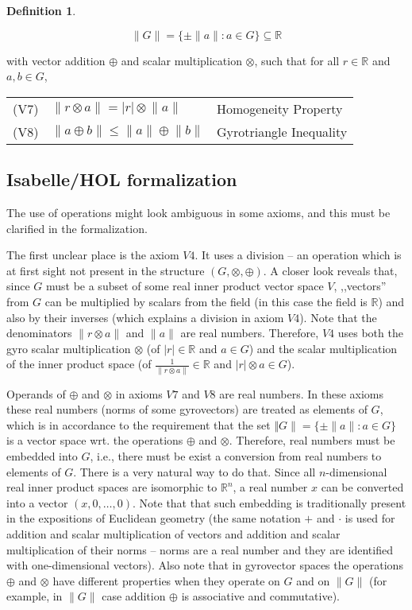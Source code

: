 \documentclass[a4paper]{article}
\theoremstyle{definition}
\newtheorem{definition}{Definition}[section]
\begin{document}
\begin{definition}
\begin{itemize}
  $$\lVert G \rVert = \{\pm \lVert a \rVert:a\in G\}\subseteq \mathbb{R}$$
  
  with vector addition $\oplus$ and scalar multiplication $\otimes$, such that for all $r\in \mathbb{R}$ and $a, b \in G$,\\[2mm]
  \begin{tabular}{cll}
    (V7) & $\lVert r\otimes a \rVert = |r| \otimes \lVert a \rVert$ & Homogeneity Property\\[1mm]
    (V8) & $\lVert a \oplus b \rVert \leq \lVert a \rVert \oplus \lVert b \rVert$ & Gyrotriangle Inequality\\ 
  \end{tabular}
\end{itemize}
\end{definition}

\subsection{Isabelle/HOL formalization}

The use of operations might look ambiguous in some axioms, and this
must be clarified in the formalization.

The first unclear place is the axiom $V4$. It uses a division -- an
operation which is at first sight not present in the structure
$(G, \otimes, \oplus)$. A closer look reveals that, since $G$ must be
a subset of some real inner product vector space $V$, ,,vectors'' from
$G$ can be multiplied by scalars from the field (in this case the
field is $\mathbb{R}$) and also by their inverses (which explains a
division in axiom $V4$). Note that the denominators
$\lVert r \otimes a \rVert$ and $\lVert a \rVert$ are real
numbers. Therefore, $V4$ uses both the gyro scalar multiplication
$\otimes$ (of $|r| \in \mathbb{R}$ and $a \in G$) and the scalar
multiplication of the inner product space (of
$\frac{1}{\lVert r \otimes a \rVert} \in \mathbb{R}$ and
$|r|\otimes a \in G$).

Operands of $\oplus$ and $\otimes$ in axioms $V7$ and $V8$ are real
numbers. In these axioms these real numbers (norms of some
gyrovectors) are treated as elements of $G$, which is in accordance to
the requirement that the set
$\Vert G \rVert = \{\pm \lVert a \rVert:a\in G\}$ is a vector space
wrt. the operations $\oplus$ and $\otimes$. Therefore, real numbers
must be embedded into $G$, i.e., there must be exist a conversion from
real numbers to elements of $G$. There is a very natural way to do
that. Since all $n$-dimensional real inner product spaces are
isomorphic to $\mathbb{R}^n$, a real number $x$ can be converted into
a vector $(x, 0, \ldots, 0)$. Note that that such embedding is
traditionally present in the expositions of Euclidean geometry (the
same notation $+$ and $\cdot$ is used for addition and scalar
multiplication of vectors and addition and scalar multiplication of
their norms -- norms are a real number and they are identified with
one-dimensional vectors). Also note that in gyrovector spaces the
operations $\oplus$ and $\otimes$ have different properties when they
operate on $G$ and on $\lVert G\rVert$ (for example, in
$\lVert G \rVert$ case addition $\oplus$ is associative and
commutative).
\end{document}

